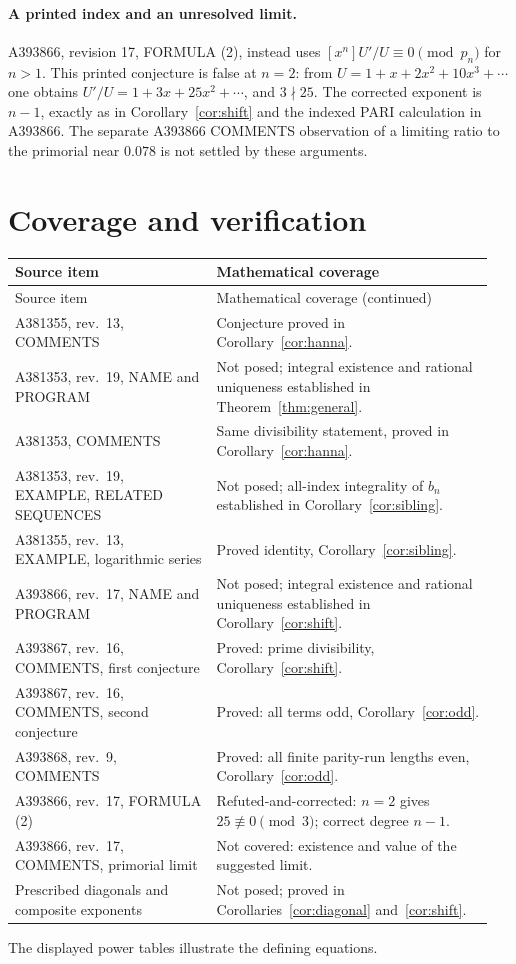 \documentclass[11pt]{article}
\newcommand{\coeff}[1]{[x^{#1}]}
\begin{document}
\paragraph{A printed index and an unresolved limit.}
A393866, revision 17, FORMULA (2), instead uses
$\coeff n U'/U\equiv0\pmod{p_n}$ for $n>1$.
This printed conjecture is false at $n=2$: from
$U=1+x+2x^2+10x^3+\cdots$ one obtains
$U'/U=1+3x+25x^2+\cdots$, and $3\nmid25$.
The corrected exponent is $n-1$, exactly as in
Corollary~\ref{cor:shift} and the indexed PARI calculation in A393866.
The separate A393866 COMMENTS observation of a limiting ratio to the
primorial near $0.078$ is not settled by these arguments.

\section{Coverage and verification}
{
\small
\begin{longtable}{@{}>{\raggedright\arraybackslash}p{0.40\linewidth}>{\raggedright\arraybackslash}p{0.55\linewidth}@{}}
\toprule
Source item & Mathematical coverage \\
\midrule
\endfirsthead
\toprule
Source item & Mathematical coverage (continued) \\
\midrule
\endhead
A381355, rev.\ 13, COMMENTS & Conjecture proved in Corollary~\ref{cor:hanna}. \\
A381353, rev.\ 19, NAME and PROGRAM & Not posed; integral existence and rational uniqueness established in Theorem~\ref{thm:general}. \\
A381353, COMMENTS & Same divisibility statement, proved in Corollary~\ref{cor:hanna}. \\
A381353, rev.\ 19, EXAMPLE, RELATED SEQUENCES & Not posed; all-index integrality of $b_n$ established in Corollary~\ref{cor:sibling}. \\
A381355, rev.\ 13, EXAMPLE, logarithmic series & Proved identity, Corollary~\ref{cor:sibling}. \\
A393866, rev.\ 17, NAME and PROGRAM & Not posed; integral existence and rational uniqueness established in Corollary~\ref{cor:shift}. \\
A393867, rev.\ 16, COMMENTS, first conjecture & Proved: prime divisibility, Corollary~\ref{cor:shift}. \\
A393867, rev.\ 16, COMMENTS, second conjecture & Proved: all terms odd, Corollary~\ref{cor:odd}. \\
A393868, rev.\ 9, COMMENTS & Proved: all finite parity-run lengths even, Corollary~\ref{cor:odd}. \\
A393866, rev.\ 17, FORMULA (2) & Refuted-and-corrected: $n=2$ gives $25\not\equiv0\pmod3$; correct degree $n-1$. \\
A393866, rev.\ 17, COMMENTS, primorial limit & Not covered: existence and value of the suggested limit. \\
Prescribed diagonals and composite exponents & Not posed; proved in Corollaries~\ref{cor:diagonal} and~\ref{cor:shift}. \\
\bottomrule
\end{longtable}
}
The displayed power tables illustrate the defining equations.
\end{document}
